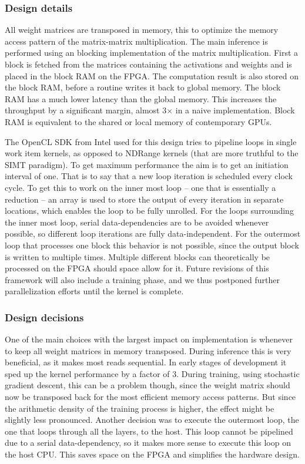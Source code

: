 \documentclass[techrep,english]{ipsj} %
\begin{document}
{\subsubsection{Design details}
All weight matrices are transposed in memory, this to optimize the memory access pattern of the matrix-matrix multiplication.
The main inference is performed using an blocking implementation of the matrix multiplication.
First a block is fetched from the matrices containing the activations and weights and is placed in the block RAM on the FPGA.
The computation result is also stored on the block RAM, before a routine writes it back to global memory.
The block RAM has a much lower latency than the global memory.
This increases the throughput by a significant margin, almost 3\(\times\) in a naive implementation.
Block RAM is equivalent to the shared or local memory of contemporary GPUs.

The OpenCL SDK from Intel used for this design tries to pipeline loops in single work item kernels, as opposed to NDRange kernels (that are more truthful to the SIMT paradigm).
To get maximum performance the aim is to get an initiation interval of one.
That is to say that a new loop iteration is scheduled every clock cycle.
To get this to work on the inner most loop -- one that is essentially a reduction -- an array is used to store the output of every iteration in separate locations, which enables the loop to be fully unrolled.
For the loops surrounding the inner most loop, serial data-dependencies are to be avoided whenever possible, so different loop iterations are fully data-independent.
For the outermost loop that processes one block this behavior is not possible, since the output block is written to multiple times.
Multiple different blocks can theoretically be processed on the FPGA should space allow for it.
Future revisions of this framework will also include a training phase, and we thus postponed further parallelization efforts until the kernel is complete.

\subsubsection{Design decisions}
One of the main choices with the largest impact on implementation is whenever to keep all weight matrices in memory transposed.
During inference this is very beneficial, as it makes most reads sequential.
In early stages of development it sped up the kernel performance by a factor of \num{3}.
During training, using stochastic gradient descent, this can be a problem though, since the weight matrix should now be transposed back for the most efficient memory access patterns.
But since the arithmetic density of the training process is higher, the effect might be slightly less pronounced.
Another decision was to execute the outermost loop, the one that loops through all the layers, to the host.
This loop cannot be pipelined due to a serial data-dependency, so it makes more sense to execute this loop on the host CPU.
This saves space on the FPGA and simplifies the hardware design.

}
\end{document}
